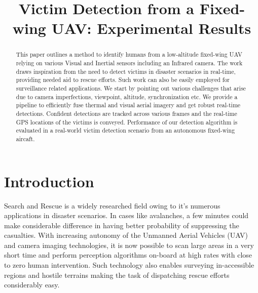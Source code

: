 \documentclass[runningheads]{llncs}
\begin{document}
\pagestyle{headings}

\mainmatter

\title{Victim Detection from a Fixed-wing UAV: Experimental Results}




\maketitle

\begin{abstract}
This paper outlines a method to identify humans from a low-altitude fixed-wing UAV relying on various Visual and Inertial sensors including an Infrared camera. The work draws inspiration from the need to detect victims in disaster scenarios in real-time, providing needed aid to rescue efforts. Such work can also be easily employed for surveillance related applications. We start by pointing out various challenges that arise due to camera imperfections, viewpoint, altitude, synchronization etc. We provide a pipeline to efficiently fuse thermal and visual aerial imagery and get robust real-time detections. Confident detections are tracked across various frames and the real-time GPS locations of the victims is conveyed. Performance of our detection algorithm is evaluated in a real-world victim detection scenario from an autonomous fixed-wing aircaft.
\end{abstract}


\section{Introduction}
Search and Rescue is a widely researched field owing to it's numerous applications in disaster scenarios. In cases like avalanches, a few minutes could make considerable difference in having better probability of suppressing the casualties. With increasing autonomy of the Unmanned Aerial Vehicles (UAV) and camera imaging technologies, it is now possible to scan large areas in a very short time and perform perception algorithms on-board at high rates with close to zero human intervention. Such technology also enables surveying in-accessible regions and hostile terrains making the task of dispatching rescue efforts considerably easy.
\end{document}
